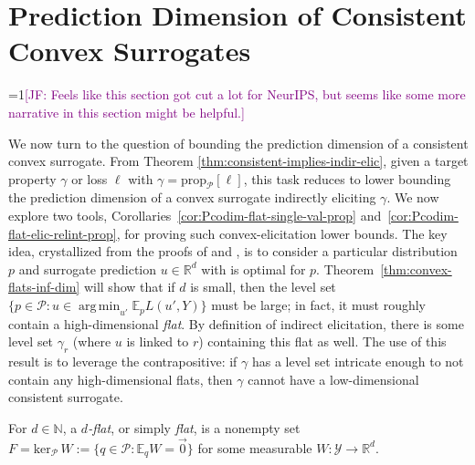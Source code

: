 \documentclass[anon,12pt]{colt2021} %
\newcommand{\Comments}{1}
\newcommand{\mynote}[2]{\ifnum\Comments=1\textcolor{#1}{#2}\fi}
\newcommand{\mytodo}[2]{\ifnum\Comments=1%
	\todo[linecolor=#1!80!black,backgroundcolor=#1,bordercolor=#1!80!black]{#2}\fi}
\newcommand{\jessie}[1]{\mynote{purple}{[JF: #1]}}
\newcommand{\jessiet}[1]{\mytodo{purple!20!white}{JF: #1}}
\newcommand{\reals}{\mathbb{R}}
\newcommand{\simplex}{\Delta_\Y}
\newcommand{\prop}[2][\mathcal{P}]{\mathrm{prop}_{#1}[#2]}
\newcommand{\spn}{\mathrm{span}}
\newcommand{\zeros}[1]{\mathrm{ker}_\P\,#1}
\newcommand{\affhull}{\mathrm{affhull}}
\newcommand{\E}{\mathbb{E}}
\renewcommand{\P}{\mathcal{P}}
\newcommand{\Y}{\mathcal{Y}}
\newcommand{\exploss}[3]{\E_{#3} #1(#2,Y)}
\DeclareMathOperator*{\argmin}{arg\,min}
\begin{document}
\section{Prediction Dimension of Consistent Convex Surrogates}\label{sec:char-convex}
\jessie{Feels like this section got cut a lot for NeurIPS, but seems like some more narrative in this section might be helpful.}

We now turn to the question of bounding the prediction dimension of a consistent convex surrogate.
From Theorem \ref{thm:consistent-implies-indir-elic}, given a target property $\gamma$ or loss $\ell$ with $\gamma = \prop{\ell}$, this task reduces to lower bounding the prediction dimension of a convex surrogate indirectly eliciting $\gamma$.
We now explore two tools, Corollaries~\ref{cor:Pcodim-flat-single-val-prop} and~\ref{cor:Pcodim-flat-elic-relint-prop}, for proving such convex-elicitation lower bounds.
The key idea, crystallized from the proofs of \citet[Theorem 16]{ramaswamy2016convex} and \citet[Theorem~9]{agarwal2015consistent}, is to consider a particular distribution~$p$ and surrogate prediction $u \in \reals^d$ with is optimal for $p$.
Theorem~\ref{thm:convex-flats-inf-dim} will show that if $d$ is small, then the level set $\{p \in \P : u \in \argmin_{u'} \exploss{L}{u'}{p}\}$ must be large; in fact, it must roughly contain a high-dimensional \emph{flat}.
By definition of indirect elicitation, there is some level set $\gamma_r$ (where $u$ is linked to $r$) containing this flat as well.
The use of this result is to leverage the contrapositive: if $\gamma$ has a level set intricate enough to not contain any high-dimensional flats, then $\gamma$ cannot have a low-dimensional consistent surrogate.


\begin{definition}[Flat]\label{def:flat-general}
  For $d\in\mathbb N$, a \emph{$d$-flat}, or simply \emph{flat}, is a nonempty set $F = \zeros{W} := \{q \in \P : \E_q W = \vec 0\}$ for some measurable $W:\Y \to \reals^d$.
\end{definition}
\end{document}
